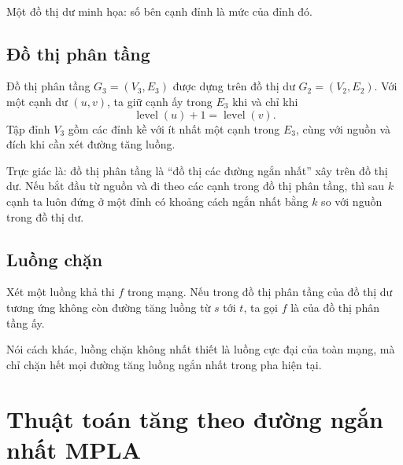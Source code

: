 \documentclass[11pt]{article}
\newcommand{\level}{\operatorname{level}}
\begin{document}
\begin{center}
\\
\small Một đồ thị dư minh họa: số bên cạnh đỉnh là mức của đỉnh đó.
\end{center}

\subsection{Đồ thị phân tầng}

Đồ thị phân tầng \(G_3=(V_3,E_3)\) được dựng trên đồ thị dư \(G_2=(V_2,E_2)\).
Với một cạnh dư \((u,v)\), ta giữ cạnh ấy trong \(E_3\) khi và chỉ khi
\[
  \level(u)+1=\level(v).
\]
Tập đỉnh \(V_3\) gồm các đỉnh kề với ít nhất một cạnh trong \(E_3\), cùng với
nguồn và đích khi cần xét đường tăng luồng.

Trực giác là: đồ thị phân tầng là ``đồ thị các đường ngắn nhất'' xây trên đồ
thị dư. Nếu bắt đầu từ nguồn và đi theo các cạnh trong đồ thị phân tầng, thì
sau \(k\) cạnh ta luôn đứng ở một đỉnh có khoảng cách ngắn nhất bằng \(k\) so
với nguồn trong đồ thị dư.

\subsection{Luồng chặn}

Xét một luồng khả thi \(f\) trong mạng. Nếu trong đồ thị phân tầng của đồ thị
dư tương ứng không còn đường tăng luồng từ \(s\) tới \(t\), ta gọi \(f\) là
 của đồ thị phân tầng ấy.

Nói cách khác, luồng chặn không nhất thiết là luồng cực đại của toàn mạng, mà
chỉ chặn hết mọi đường tăng luồng ngắn nhất trong pha hiện tại.

\section{Thuật toán tăng theo đường ngắn nhất MPLA}
\end{document}
